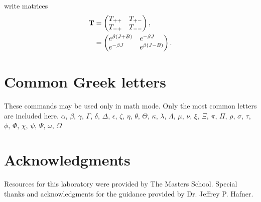 \documentclass[
    10pt,aps,prl,
    amsfonts,
    amssymb,
    amsmath,
    runinaddress,
    secnum,
    showkeys,
    superscriptaddress,
    twocolumn,
]{revtex4}
\begin{document}
write matrices
\begin{align}
\textbf{T} &=
\begin{pmatrix}
T_{++} \hfill & T_{+-} \\
T_{-+} & T_{--} \hfill 
\end{pmatrix}, \nonumber \\
& =
\begin{pmatrix}
e^{\beta (J + B)} \hfill & e^{-\beta J} \hfill \\
e^{-\beta J} \hfill & e^{\beta (J - B)} \hfill
\end{pmatrix}.
\end{align}

\section{Common Greek letters}

These commands may be used only in math mode. 
Only the most common letters are included here.
$\alpha$, $\beta$, $\gamma$, $\Gamma$, $\delta$, $\Delta$, $\epsilon$, $\zeta$, $\eta$, $\theta$, $\Theta$, $\kappa$, $\lambda$, $\Lambda$, $\mu$, $\nu$, $\xi$, $\Xi$, $\pi$, $\Pi$, $\rho$, $\sigma$, $\tau$, $\phi$, $\Phi$, $\chi$, $\psi$, $\Psi$, $\omega$, $\Omega$



\section{Acknowledgments}
\label{sec:ack}
\begin{acknowledgments}
    Resources for this laboratory were provided by The Masters School.
    Special thanks and acknowledgments for the guidance provided by Dr. Jeffrey P. Hafner.
\end{acknowledgments}




\end{document}
